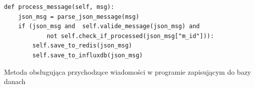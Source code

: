 \begin{lstfloat}[h!]
    \lstset{language=Python}
    \begin{lstlisting}[frame=single]
def process_message(self, msg):
    json_msg = parse_json_message(msg)
    if (json_msg and  self.valide_message(json_msg) and 
            not self.check_if_processed(json_msg["m_id"])):
        self.save_to_redis(json_msg)
        self.save_to_influxdb(json_msg)
\end{lstlisting}
    \caption{Metoda obsługująca przychodzące wiadomości w programie zapisującym do bazy danach}\label{lst:mess-recv}
\end{lstfloat}
